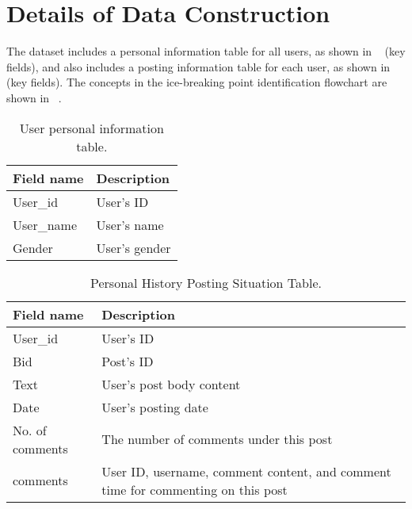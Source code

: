 \section{Details of Data Construction }
\label{apd:data_details}
The dataset includes a personal information table for all users, as shown in ~ (key fields), and also includes a posting information table for each user, as shown in ~ (key fields). The concepts in the ice-breaking point identification flowchart are shown in ~.
\begin{table}[th]
	\small
	\begin{tabular}{p{}|p{}}
		\toprule
		\textbf{Field name} & \textbf{Description} \\ \midrule
		User\_id & User's ID \\ \midrule
		User\_name & User's name   \\ \midrule
        Gender & User's gender   \\ \midrule
	\end{tabular}
	\caption{User personal information table.}
	\label{tab:User}
\end{table}
\begin{table}[th]
	\small
	\begin{tabular}{p{}|p{}}
		\toprule
		\textbf{Field name} & \textbf{Description} \\ \midrule
		User\_id & User's ID \\ \midrule
		Bid & Post's ID   \\ \midrule
        Text & User's post body content \\ \midrule
        Date & User's posting date   \\ \midrule
        No. of comments & The number of comments under this post   \\ \midrule
        comments & User ID, username, comment content, and comment time for commenting on this post   \\ \midrule
	\end{tabular}
	\caption{Personal History Posting Situation Table.}
	\label{tab:Post}
\end{table}


